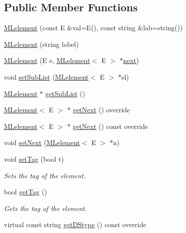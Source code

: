 \subsection*{Public Member Functions}
\begin{DoxyCompactItemize}
\item 
\mbox{\hyperlink{classbridges_1_1datastructure_1_1_m_lelement_af73050e460a47d0b5d82ee6ae49b6c59}{M\+Lelement}} (const E \&val=E(), const string \&lab=string())
\item 
\mbox{\hyperlink{classbridges_1_1datastructure_1_1_m_lelement_aae22c04d644bcab2eba56bb8dc84d5eb}{M\+Lelement}} (string label)
\item 
\mbox{\hyperlink{classbridges_1_1datastructure_1_1_m_lelement_ac3349ecdbce79646839cdb9ea1e90b2f}{M\+Lelement}} (E e, \mbox{\hyperlink{classbridges_1_1datastructure_1_1_m_lelement}{M\+Lelement}}$<$ E $>$ $\ast$\mbox{\hyperlink{classbridges_1_1datastructure_1_1_s_lelement_afc016a593a4a5aba82021ee34edadbfc}{next}})
\item 
void \mbox{\hyperlink{classbridges_1_1datastructure_1_1_m_lelement_a5d6a2fa775c819c8c7609b539c93fe9f}{set\+Sub\+List}} (\mbox{\hyperlink{classbridges_1_1datastructure_1_1_m_lelement}{M\+Lelement}}$<$ E $>$ $\ast$sl)
\item 
\mbox{\hyperlink{classbridges_1_1datastructure_1_1_m_lelement}{M\+Lelement}} $\ast$ \mbox{\hyperlink{classbridges_1_1datastructure_1_1_m_lelement_a9faeb30ffd023746ce36e05705a62b2d}{get\+Sub\+List}} ()
\item 
\mbox{\hyperlink{classbridges_1_1datastructure_1_1_m_lelement}{M\+Lelement}}$<$ E $>$ $\ast$ \mbox{\hyperlink{classbridges_1_1datastructure_1_1_m_lelement_a47b417db0b948b6899eece572bef9274}{get\+Next}} () override
\item 
\mbox{\hyperlink{classbridges_1_1datastructure_1_1_m_lelement}{M\+Lelement}}$<$ E $>$ $\ast$ \mbox{\hyperlink{classbridges_1_1datastructure_1_1_m_lelement_a611b3e7d54fdfbc622004a50ca718e6e}{get\+Next}} () const override
\item 
void \mbox{\hyperlink{classbridges_1_1datastructure_1_1_m_lelement_a13dfba9b3fa1af26c6d344fa7a086429}{set\+Next}} (\mbox{\hyperlink{classbridges_1_1datastructure_1_1_m_lelement}{M\+Lelement}}$<$ E $>$ $\ast$n)
\item 
void \mbox{\hyperlink{classbridges_1_1datastructure_1_1_m_lelement_a32ba4ec57e6f5e1e65f82784a7f45804}{set\+Tag}} (bool t)
\begin{DoxyCompactList}\small\item\em Sets the tag of the element. \end{DoxyCompactList}\item 
bool \mbox{\hyperlink{classbridges_1_1datastructure_1_1_m_lelement_a44ef87048b6b0424478f498cf99149f2}{get\+Tag}} ()
\begin{DoxyCompactList}\small\item\em Gets the tag of the element. \end{DoxyCompactList}\item 
virtual const string \mbox{\hyperlink{classbridges_1_1datastructure_1_1_m_lelement_a735c3cb43648b4d4e7d3316cdc1a1952}{get\+D\+Stype}} () const override
\end{DoxyCompactItemize}
